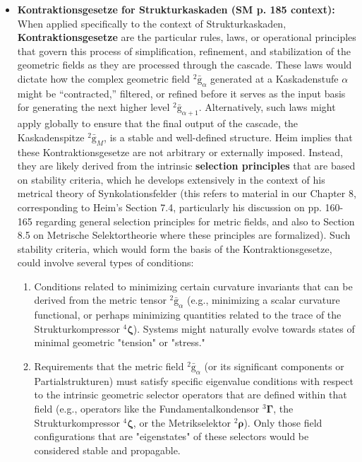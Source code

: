\documentclass[12pt]{article}
\newcommand{\q}[1]{\enquote{#1}}
\newcommand{\kompositionsfeld}{{}^2\bar{\mathrm{g}}}
\newcommand{\fundamentalkondensor}{{}^3\bm{\Gamma}}
\newcommand{\kaskadenstufe}{\alpha}
\newcommand{\strukturkompressor}{{}^4\bm{\zeta}}
\begin{document}
\begin{itemize}
    \item \textbf{Kontraktionsgesetze for Strukturkaskaden (SM p. 185 context):}
    When applied specifically to the context of Strukturkaskaden, \textbf{Kontraktionsgesetze} are the particular rules, laws, or operational principles that govern this process of simplification, refinement, and stabilization of the geometric fields as they are processed through the cascade. These laws would dictate how the complex geometric field \( \kompositionsfeld_\alpha \) generated at a Kaskadenstufe \( \kaskadenstufe \) might be \q{contracted,} filtered, or refined before it serves as the input basis for generating the next higher level \( \kompositionsfeld_{\alpha+1} \). Alternatively, such laws might apply globally to ensure that the final output of the cascade, the Kaskadenspitze \( \kompositionsfeld_M \), is a stable and well-defined structure.
    Heim implies that these Kontraktionsgesetze are not arbitrary or externally imposed. Instead, they are likely derived from the intrinsic \textbf{selection principles} that are based on stability criteria, which he develops extensively in the context of his metrical theory of Synkolationsfelder (this refers to material in our Chapter 8, corresponding to Heim's Section 7.4, particularly his discussion on pp. 160-165 regarding general selection principles for metric fields, and also to Section 8.5 on Metrische Selektortheorie where these principles are formalized). Such stability criteria, which would form the basis of the Kontraktionsgesetze, could involve several types of conditions:
    \begin{enumerate}
        \item Conditions related to minimizing certain curvature invariants that can be derived from the metric tensor \( \kompositionsfeld_\alpha \) (e.g., minimizing a scalar curvature functional, or perhaps minimizing quantities related to the trace of the Strukturkompressor \( \strukturkompressor \)). Systems might naturally evolve towards states of minimal geometric "tension" or "stress."
        \item Requirements that the metric field \( \kompositionsfeld_\alpha \) (or its significant components or Partialstrukturen) must satisfy specific eigenvalue conditions with respect to the intrinsic geometric selector operators that are defined within that field (e.g., operators like the Fundamentalkondensor \( \fundamentalkondensor \), the Strukturkompressor \( \strukturkompressor \), or the Metrikselektor \( {}^2\bm{\rho} \)). Only those field configurations that are "eigenstates" of these selectors would be considered stable and propagable.

\end{enumerate}
\end{itemize}
\end{document}
